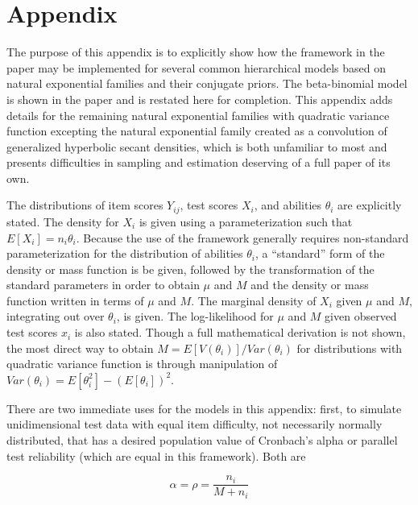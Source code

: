 \documentclass[12pt,epsfig]{article}
\begin{document}
%

\clearpage

\appendix

\section{Appendix}


The purpose of this appendix is to explicitly show how the framework in the paper may be implemented for several common hierarchical models based on natural exponential families and their conjugate priors. The beta-binomial model is shown in the paper and is restated here for completion. This appendix adds details for the remaining natural exponential families with quadratic variance function excepting the natural exponential family created as a convolution of generalized hyperbolic secant densities, which is both unfamiliar to most and presents difficulties in sampling and estimation deserving of a full paper of its own.

The distributions of item scores $Y_{ij}$, test scores $X_i$, and abilities $\theta_i$ are explicitly stated. The density for $X_i$ is given using a parameterization such that $E[X_i] = n_i \theta_i$. Because the use of the framework generally requires non-standard parameterization for the distribution of abilities $\theta_i$, a ``standard'' form of the density or mass function is be given, followed by the transformation of the standard parameters in order to obtain $\mu$ and $M$ and the density or mass function written in terms of $\mu$ and $M$. The marginal density of $X_i$ given $\mu$ and $M$, integrating out over $\theta_i$, is given. The log-likelihood for $\mu$ and $M$ given observed test scores $x_i$ is also stated. Though a full mathematical derivation is not shown, the most direct way to obtain $M = E[V(\theta_i)]/Var(\theta_i)$ for distributions with quadratic variance function is through manipulation of $Var(\theta_i) = E[\theta_i^2] - (E[\theta_i])^2$. 

There are two immediate uses for the models in this appendix: first, to simulate unidimensional test data with equal item difficulty, not necessarily normally distributed, that has a desired population value of Cronbach's alpha or parallel test reliability (which are equal in this framework). Both are

\begin{equation*}
    \alpha = \rho =  \dfrac{n_i}{M + n_i}
\end{equation*}
\end{document}
